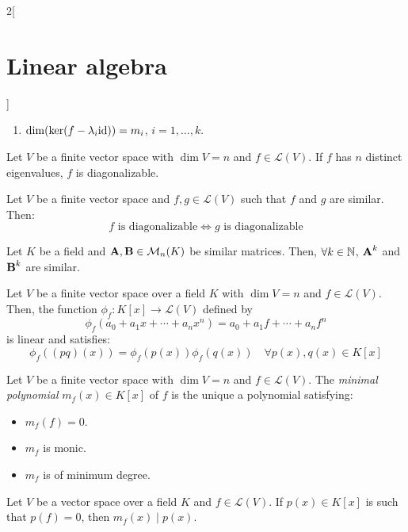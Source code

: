 \documentclass[../../../main.tex]{subfiles}
\begin{document}
\begin{multicols}{2}[\section{Linear algebra}]
\begin{theorem}
\begin{enumerate}
      \item $\dim(\ker(f-\lambda_i \mathrm{id}))=m_i$, $i=1,\ldots,k$.
    \end{enumerate}
  \end{theorem}
  \begin{corollary}
    Let $V$ be a finite vector space with $\dim V=n$ and $f\in\mathcal{L}(V)$. If $f$ has $n$ distinct eigenvalues, $f$ is diagonalizable.
  \end{corollary}
  \begin{proposition}
    Let $V$ be a finite vector space and $f,g\in\mathcal{L}(V)$ such that $f$ and $g$ are similar. Then: $$f\text{ is diagonalizable}\iff g\text{ is diagonalizable}$$
  \end{proposition}
  \begin{lemma}
    Let $K$ be a field and $\boldsymbol{\mathrm{A}},\boldsymbol{\mathrm{B}}\in\mathcal{M}_n(K)$ be similar matrices. Then, $\forall k\in\mathbb{N}$, $\boldsymbol{\mathrm{A}}^k$ and $\boldsymbol{\mathrm{B}}^k$ are similar.
  \end{lemma}
  \begin{lemma}
    Let $V$ be a finite vector space over a field $K$ with $\dim V=n$ and $f\in\mathcal{L}(V)$. Then, the function $\phi_f:K[x]\rightarrow\mathcal{L}(V)$ defined by $$\phi_f(a_0+a_1x+\cdots+a_nx^n)=a_0+a_1f+\cdots+a_nf^n$$
    is linear and satisfies: $$\phi_f((pq)(x))=\phi_f(p(x))\phi_f(q(x))\quad\forall p(x),q(x)\in K[x]$$
  \end{lemma}
  \begin{definition}
    Let $V$ be a finite vector space with $\dim V=n$ and $f\in\mathcal{L}(V)$. The \emph{minimal polynomial} $m_f(x)\in K[x]$ of $f$ is the unique a polynomial satisfying:
    \begin{itemize}
      \item $m_f(f)=0$.
      \item $m_f$ is monic.
      \item $m_f$ is of minimum degree.
    \end{itemize}
  \end{definition}
  \begin{proposition}
    Let $V$ be a vector space over a field $K$ and $f\in\mathcal{L}(V)$. If $p(x)\in K[x]$ is such that $p(f)=0$, then $m_f(x)\mid p(x)$.
  \end{proposition}

\end{multicols}
\end{document}
